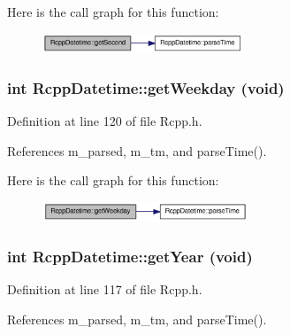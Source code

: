 Here is the call graph for this function:\nopagebreak
\begin{figure}[H]
\begin{center}
\leavevmode
\includegraphics[width=170pt]{classRcppDatetime_a2feb900005890d183cc5f6a626c4d614_cgraph}
\end{center}
\end{figure}
\hypertarget{classRcppDatetime_a796802561fa8bb87a8e2a1836afaaa58}{
\subsubsection[{getWeekday}]{\setlength{\rightskip}{0pt plus 5cm}int RcppDatetime::getWeekday (void)}}
\label{classRcppDatetime_a796802561fa8bb87a8e2a1836afaaa58}


Definition at line 120 of file Rcpp.h.

References m\_\-parsed, m\_\-tm, and parseTime().

Here is the call graph for this function:\nopagebreak
\begin{figure}[H]
\begin{center}
\leavevmode
\includegraphics[width=174pt]{classRcppDatetime_a796802561fa8bb87a8e2a1836afaaa58_cgraph}
\end{center}
\end{figure}
\hypertarget{classRcppDatetime_aba930a8d7d575eb10444258a442027cf}{
\subsubsection[{getYear}]{\setlength{\rightskip}{0pt plus 5cm}int RcppDatetime::getYear (void)}}
\label{classRcppDatetime_aba930a8d7d575eb10444258a442027cf}


Definition at line 117 of file Rcpp.h.

References m\_\-parsed, m\_\-tm, and parseTime().

